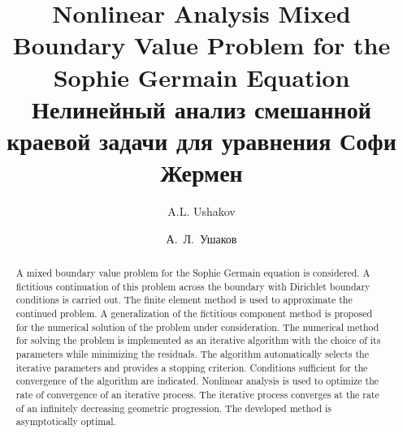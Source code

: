 \begin{englishtitle}
\title{Nonlinear Analysis
Mixed Boundary Value Problem for the Sophie Germain Equation
}
\author{A.L. Ushakov }
    
\maketitle

\begin{abstract}
A mixed boundary value problem for the Sophie Germain equation is considered. A fictitious continuation of this problem across the boundary with Dirichlet boundary conditions is carried out. The finite element method is used to approximate the continued problem. A generalization of the fictitious component method is proposed for the numerical solution of the problem under consideration. The numerical method for solving the problem is implemented as an iterative algorithm with the choice of its parameters while minimizing the residuals. The algorithm automatically selects the iterative parameters and provides a stopping criterion. Conditions sufficient for the convergence of the algorithm are indicated. Nonlinear analysis is used to optimize the rate of convergence of an iterative process. The iterative process converges at the rate of an infinitely decreasing geometric progression. The developed method is asymptotically optimal.
\end{abstract}
\end{englishtitle}

\iffalse



\documentclass[12pt]{llncs}
\usepackage[T2A]{fontenc}
\usepackage[utf8]{inputenc}
\usepackage[english,russian]{babel}
\usepackage[russian]{nla}




\fi

\title{Нелинейный анализ
смешанной краевой задачи для уравнения Софи Жермен}
\author{А.~Л.~Ушаков}

